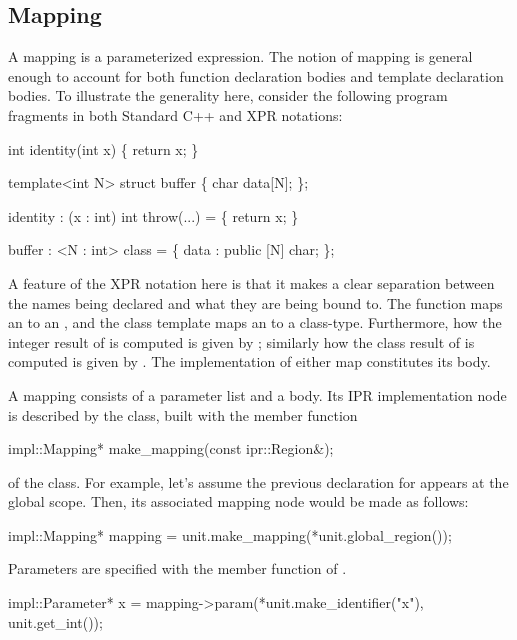 \documentclass[a4paper,12pt]{article}
\begin{document}
\subsection{Mapping}
\label{sec:fun-decl.mapping}

A mapping is a parameterized expression.   The notion of mapping is general
enough to account for both function declaration bodies and template
declaration bodies.  To illustrate the generality here, consider the following 
program fragments in both Standard C++ and XPR notations:
\begin{center}
\begin{minipage}[t]{13cm}
  \begin{minipage}[t]{4cm}
    \begin{Program}
int identity(int x) \{
  return x;
\}

template<int N>
struct buffer \{
   char data[N];
\};
    \end{Program}
  \end{minipage}\hfil \vrule \hfil
  \begin{minipage}[t]{7cm}
    \begin{Program}
identity : (x : int) int throw(...) = \{
  return x;
\}

buffer : <N : int> class = \{
  data : public [N] char;
\};
    \end{Program}
  \end{minipage}
\end{minipage}
\end{center}
A feature of the XPR notation here is that it makes a clear separation
between the names being declared and what they are being bound to.  The
function  maps an  to an , and the class
template  maps an  to a class-type.  Furthermore, how
the integer result of  is computed is given by 
; similarly how the class result of  is
computed is given by .  The implementation 
of either map constitutes its body.

A mapping consists of a parameter list and a body.  Its IPR implementation
node is described by the class, built with the member
function 
\begin{Program}
  impl::Mapping* make_mapping(const ipr::Region&);
\end{Program}
of the  class.  For example, let's assume the previous
declaration for  appears at the global scope.  Then, its
associated mapping node would be made as follows:
\begin{Program}
impl::Mapping* mapping = unit.make_mapping(*unit.global_region());  
\end{Program}
Parameters are specified with the  member function
of .  
\begin{Program}
impl::Parameter* x = mapping->param(*unit.make_identifier("x"), unit.get_int());
\end{Program}
\end{document}
